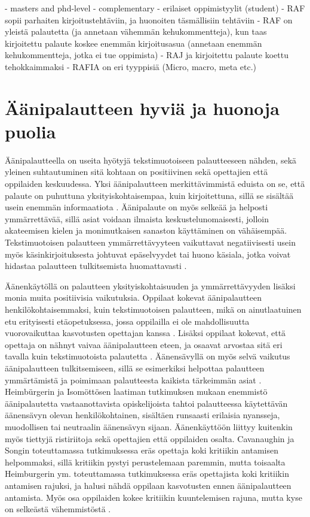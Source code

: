 \documentclass[utf8]{gradu3}
\begin{document}
- masters and phd-level
- complementary
- erilaiset oppimistyylit (student)
- RAF sopii parhaiten kirjoitustehtäviin, ja huonoiten täsmällisiin tehtäviin
- RAF on yleistä palautetta (ja annetaan vähemmän kehukommentteja), kun taas kirjoitettu palaute koskee enemmän kirjoitusasua (annetaan enemmän kehukommentteja, jotka ei tue oppimista)
- RAJ ja kirjoitettu palaute koettu tehokkaimmaksi
- RAFIA on eri tyyppisiä (Micro, macro, meta etc.)

\section{Äänipalautteen hyviä ja huonoja puolia}

Äänipalautteella on useita hyötyjä tekstimuotoiseen palautteeseen nähden, sekä yleinen suhtautuminen sitä kohtaan on positiivinen sekä opettajien että oppilaiden keskuudessa. Yksi äänipalautteen merkittävimmistä eduista on se, että palaute on puhuttuna yksityiskohtaisempaa, kuin kirjoitettuna, sillä se sisältää usein enemmän informaatiota \parencite[][]{attitudes}. Äänipalaute on myös selkeää ja helposti ymmärrettävää, sillä asiat voidaan ilmaista keskustelunomaisesti, jolloin akateemisen kielen ja monimutkaisen sanaston käyttäminen on vähäisempää. Tekstimuotoisen palautteen ymmärrettävyyteen vaikuttavat negatiivisesti usein myös käsinkirjoituksesta johtuvat epäselvyydet tai huono käsiala, jotka voivat hidastaa palautteen tulkitsemista huomattavasti \parencite[][]{developing}.

Äänenkäytöllä on palautteen yksityiskohtaisuuden ja ymmärrettävyyden lisäksi monia muita positiivisia vaikutuksia. Oppilaat kokevat äänipalautteen henkilökohtaisemmaksi, kuin tekstimuotoisen palautteen, mikä on ainutlaatuinen etu erityisesti etäopetuksessa, jossa oppilailla ei ole mahdollisuutta vuorovaikuttaa kasvotusten opettajan kanssa \parencite[][]{using, distanceLearning}. Lisäksi oppilaat kokevat, että opettaja on nähnyt vaivaa äänipalautteen eteen, ja osaavat arvostaa sitä eri tavalla kuin tekstimuotoista palautetta \parencite[][]{listenOrToRead}. Äänensävyllä on myös selvä vaikutus äänipalautteen tulkitsemiseen, sillä se esimerkiksi helpottaa palautteen ymmärtämistä ja poimimaan palautteesta kaikista tärkeimmän asiat \parencite[][]{attitudes}. Heimbürgerin ja Isomöttösen \parencite[][]{moderating} laatiman tutkimuksen mukaan enemmistö äänipalautetta vastaanottavista opiskelijoista tahtoi palautteessa käytettävän äänensävyn olevan henkilökohtainen, sisältäen runsaasti erilaisia nyansseja, muodollisen tai neutraalin äänensävyn sijaan. Äänenkäyttöön liittyy kuitenkin myös tiettyjä ristiriitoja sekä opettajien että oppilaiden osalta. Cavanaughin ja Songin \parencite[][]{versus} toteuttamassa tutkimuksessa eräs opettaja koki kritiikin antamisen helpommaksi, sillä kritiikin pystyi perustelemaan paremmin, mutta toisaalta Heimburgerin ym. \parencite[][]{academics} toteuttamassa tutkimuksessa eräs opettajista koki kritiikin antamisen rajuksi, ja halusi nähdä oppilaan kasvotusten ennen äänipalautteen antamista. Myös osa oppilaiden kokee kritiikin kuuntelemisen rajuna, mutta kyse on selkeästä vähemmistöstä \parencite[][]{voice}. 
\end{document}
